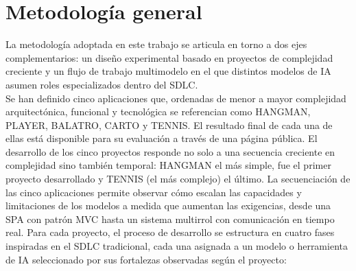 \section{Metodología general} \label{sec:metodologia-general}

La metodología adoptada en este trabajo se articula en torno a dos ejes complementarios: un diseño experimental basado en proyectos de complejidad creciente y un flujo de trabajo multimodelo en el que distintos modelos de \ac{IA} asumen roles especializados dentro del \ac{SDLC}.\\

Se han definido cinco aplicaciones que, ordenadas de menor a mayor complejidad arquitectónica, funcional y tecnológica se referencian como \ac{HANGMAN}, \ac{PLAYER}, \ac{BALATRO}, \ac{CARTO} y \ac{TENNIS}. 
El resultado final de cada una de ellas está disponible para su evaluación a través de una página \cite{URL::TFG-Web} pública.
El desarrollo de los cinco proyectos responde no solo a una secuencia creciente en complejidad sino también temporal: \ac{HANGMAN} el más simple, fue el primer proyecto desarrollado y \ac{TENNIS} (el más complejo) el último. 
La secuenciación de las cinco aplicaciones permite observar cómo escalan las capacidades y limitaciones de los modelos a medida que aumentan las exigencias, desde una \ac{SPA} con patrón \ac{MVC} hasta un sistema multirrol con comunicación en tiempo real. Para cada proyecto, el proceso de desarrollo se estructura en cuatro fases inspiradas en el \ac{SDLC}  tradicional, cada una asignada a un modelo o herramienta de \ac{IA} seleccionado por sus fortalezas observadas según el proyecto:

